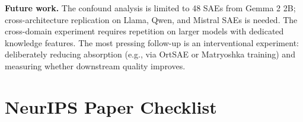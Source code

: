 \documentclass{article}
\begin{document}
\textbf{Future work.}
The confound analysis is limited to 48 SAEs from Gemma 2 2B; cross-architecture replication on Llama, Qwen, and Mistral SAEs is needed.
The cross-domain experiment requires repetition on larger models with dedicated knowledge features.
The most pressing follow-up is an interventional experiment: deliberately reducing absorption (e.g., via OrtSAE or Matryoshka training) and measuring whether downstream quality improves.




\appendix

\section{NeurIPS Paper Checklist}
\end{document}
